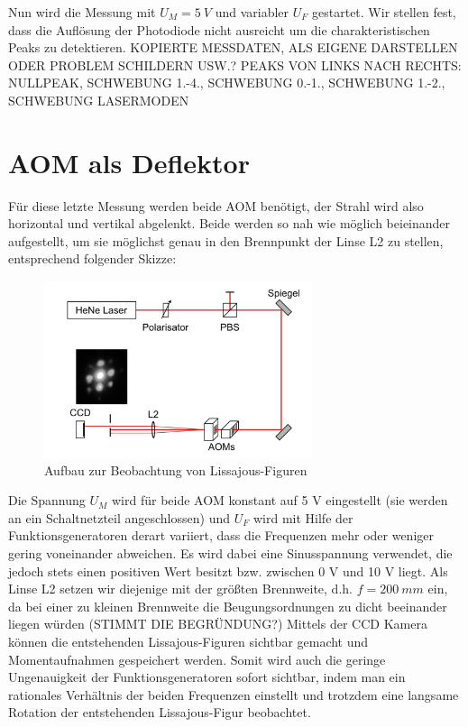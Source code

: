 \documentclass[bigchapter,colorback,accentcolor=tud4b,linedtoc,11pt]{tudreport}
\begin{document}
Nun wird die Messung mit $U_M = 5~V$ und variabler $U_F$ gestartet. Wir stellen fest, dass die Auflösung der Photodiode nicht ausreicht um die charakteristischen Peaks zu detektieren. KOPIERTE MESSDATEN, ALS EIGENE DARSTELLEN ODER PROBLEM SCHILDERN USW.? PEAKS VON LINKS NACH RECHTS: NULLPEAK, SCHWEBUNG 1.-4., SCHWEBUNG 0.-1., SCHWEBUNG 1.-2., SCHWEBUNG LASERMODEN

\section{AOM als Deflektor}

Für diese letzte Messung werden beide AOM benötigt, der Strahl wird also horizontal und vertikal abgelenkt. Beide werden so nah wie möglich beieinander aufgestellt, um sie möglichst genau in den Brennpunkt der Linse L2 zu stellen, entsprechend folgender Skizze:

\begin{figure}[H] 
  \centering
     \includegraphics[width=0.7\textwidth]{data/deflektion.jpg}
  \caption[Cap for listoffigures]{Aufbau zur Beobachtung von Lissajous-Figuren}
  \label{fig:Bild2}
\end{figure}

Die Spannung $U_M$ wird für beide AOM konstant auf 5 V eingestellt (sie werden an ein Schaltnetzteil angeschlossen) und $U_F$ wird mit Hilfe der Funktionsgeneratoren derart variiert, dass die Frequenzen mehr oder weniger gering voneinander abweichen. Es wird dabei eine Sinusspannung verwendet, die jedoch stets einen positiven Wert besitzt bzw. zwischen 0 V und 10 V liegt. Als Linse L2 setzen wir diejenige mit der größten Brennweite, d.h. $f = 200~mm$ ein, da bei einer zu kleinen Brennweite die Beugungsordnungen zu dicht beeinander liegen würden (STIMMT DIE BEGRÜNDUNG?) Mittels der CCD Kamera können die entstehenden Lissajous-Figuren sichtbar gemacht und Momentaufnahmen gespeichert werden. Somit wird auch die geringe Ungenauigkeit der Funktionsgeneratoren sofort sichtbar, indem man ein rationales Verhältnis der beiden Frequenzen einstellt und trotzdem eine langsame Rotation der entstehenden Lissajous-Figur beobachtet.
\end{document}
